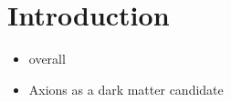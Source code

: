 \chapter{Introduction}

\begin{itemize}
	\item overall
	\item Axions as a dark matter candidate
\end{itemize}